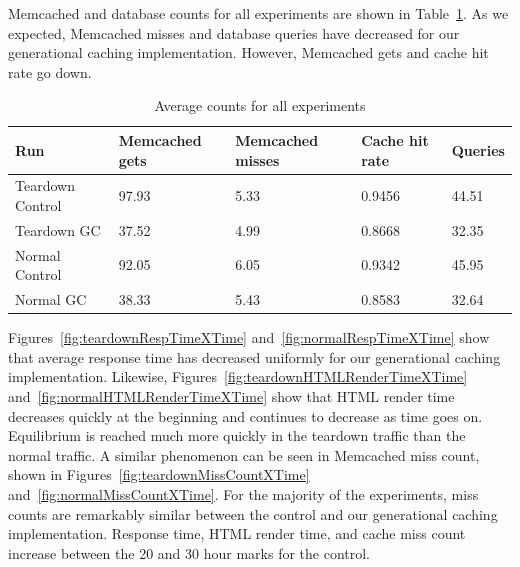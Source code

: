 \documentclass[12pt]{ucthesis}
\begin{document}
\textsf{Memcached} and database counts for all experiments are shown in Table~\ref{tab:averageExperimentCounts}.
As we expected, \textsf{Memcached} misses and database queries have decreased for our generational caching implementation.
However, \textsf{Memcached} gets and cache hit rate go down.

\begin{table}[h]
\begin{center}
\begin{tabular}{| l | l | l | l | l |}
   \hline
   Run & Memcached gets & Memcached misses & Cache hit rate & Queries \\ \hline
   Teardown Control & 97.93 & 5.33 & 0.9456 & 44.51 \\ \hline
   Teardown GC & 37.52 & 4.99 & 0.8668 & 32.35 \\ \hline
   \hline
   Normal Control & 92.05 & 6.05 & 0.9342 & 45.95 \\ \hline
   Normal GC & 38.33 & 5.43 & 0.8583 & 32.64 \\
   \hline
\end{tabular}
\end{center}
\caption{Average counts for all experiments}
\label{tab:averageExperimentCounts}
\end{table}

Figures~\ref{fig:teardownRespTimeXTime} and~\ref{fig:normalRespTimeXTime} show that average response time has decreased uniformly for our generational caching implementation.
Likewise, Figures~\ref{fig:teardownHTMLRenderTimeXTime} and~\ref{fig:normalHTMLRenderTimeXTime} show that HTML render time decreases quickly at the beginning and continues to decrease as time goes on.
Equilibrium is reached much more quickly in the teardown traffic than the normal traffic.
A similar phenomenon can be seen in \textsf{Memcached} miss count, shown in Figures~\ref{fig:teardownMissCountXTime} and~\ref{fig:normalMissCountXTime}.
For the majority of the experiments, miss counts are remarkably similar between the control and our generational caching implementation.
Response time, HTML render time, and cache miss count increase between the 20 and 30 hour marks for the control.
\end{document}
